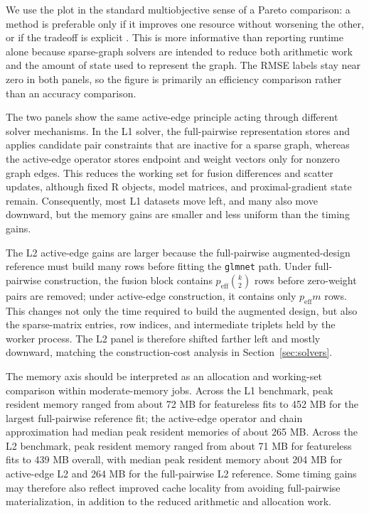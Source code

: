 \documentclass[twoside,11pt]{article}
\begin{document}
We use the plot in the standard multiobjective sense of a Pareto comparison:
a method is preferable only if it improves one resource without worsening the
other, or if the tradeoff is explicit \citep{miettinen1999nonlinear}. This is
more informative than reporting runtime alone because sparse-graph solvers are
intended to reduce both arithmetic work and the amount of state used to
represent the graph. The RMSE labels stay near zero in both panels, so the
figure is primarily an efficiency comparison rather than an accuracy
comparison.

The two panels show the same active-edge principle acting through different
solver mechanisms. In the L1 solver, the full-pairwise representation stores
and applies candidate pair constraints that are inactive for a sparse graph,
whereas the active-edge operator stores endpoint and weight vectors only for
nonzero graph edges. This reduces the working set for fusion differences and
scatter updates, although fixed R objects, model matrices, and
proximal-gradient state remain. Consequently, most L1 datasets move left, and
many also move downward, but the memory gains are smaller and less uniform
than the timing gains.

The L2 active-edge gains are larger because the full-pairwise augmented-design
reference must build many rows before fitting the \texttt{glmnet} path. Under
full-pairwise construction, the fusion block contains
$p_{\mathrm{eff}}\binom{k}{2}$ rows before zero-weight pairs are removed;
under active-edge construction, it contains only $p_{\mathrm{eff}}m$ rows.
This changes not only the time required to build the augmented design, but
also the sparse-matrix entries, row indices, and intermediate triplets held by
the worker process. The L2 panel is therefore shifted farther left and mostly
downward, matching the construction-cost analysis in
Section~\ref{sec:solvers}.

The memory axis should be interpreted as an allocation and working-set
comparison within moderate-memory jobs. Across the L1 benchmark, peak resident
memory ranged from about 72 MB for featureless fits to 452 MB for the largest
full-pairwise reference fit; the active-edge operator and chain approximation
had median peak resident memories of about 265 MB. Across the L2 benchmark,
peak resident memory ranged from about 71 MB for featureless fits to 439 MB
overall, with median peak resident memory about 204 MB for active-edge L2 and
264 MB for the full-pairwise L2 reference. Some timing gains may therefore
also reflect improved cache locality from avoiding full-pairwise
materialization, in addition to the reduced arithmetic and allocation work.
\end{document}

